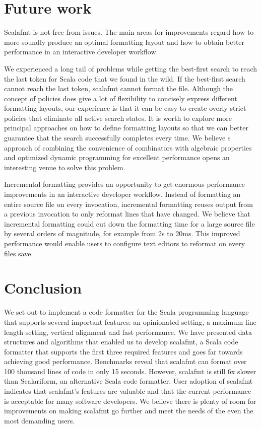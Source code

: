 
\section{Future work}
Scalafmt is not free from issues.
The main areas for improvements regard how to more soundly produce an optimal formatting layout and how to obtain better performance in an interactive developer workflow.

We experienced a long tail of problems while getting the best-first search to reach the last token for Scala code that we found in the wild.
If the best-first search cannot reach the last token, scalafmt cannot format the file.
Although the concept of policies does give a lot of flexibility to concisely express different formatting layouts, our experience is that it can be easy to create overly strict policies that eliminate all active search states.
It is worth to explore more principal approaches on how to define formatting layouts so that we can better guarantee that the search successfully completes every time.
We believe \rfmt{}s approach of combining the convenience of combinators with algebraic properties and optimized dynamic programming for excellent performance opens an interesting venue to solve this problem.

Incremental formatting provides an opportunity to get enormous performance improvements in an interactive developer workflow.
Instead of formatting an entire source file on every invocation, incremental formatting reuses output from a previous invocation to only reformat lines that have changed.
We believe that incremental formatting could cut down the formatting time for a large source file by several orders of magnitude, for example from 2s to 20ms.
This improved performance would enable users to configure text editors to reformat on every files save.

\section{Conclusion}
We set out to implement a code formatter for the Scala programming language that supports several important features: an opinionated setting, a maximum line length setting, vertical alignment and fast performance.
We have presented data structures and algorithms that enabled us to develop scalafmt, a Scala code formatter that supports the first three required features and goes far towards achieving good performance.
Benchmarks reveal that scalafmt can format over 100 thousand lines of code in only 15 seconds.
However, scalafmt is still 6x slower than Scalariform, an alternative Scala code formatter.
User adoption of scalafmt indicates that scalafmt's features are valuable and that the current performance is acceptable for many software developers.
We believe there is plenty of room for improvements on making scalafmt go further and meet the needs of the even the most demanding users.
